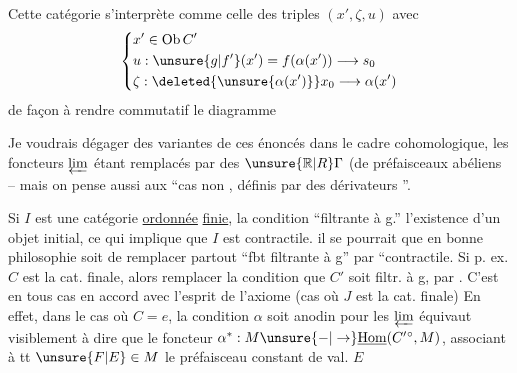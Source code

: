 Cette catégorie s'interprète comme celle des triples $(x',\zeta,u)$ avec
\[
\left\{\begin{aligned}
 &x'\in\operatorname{Ob}C'\\
 &u:\unsure{g|f'}(x')=f(\alpha(x'))\longrightarrow s_0\\
 &\zeta:\deleted{\unsure{\alpha(x')}}x_0\longrightarrow\alpha(x')
\end{aligned}\right.
\]
de façon à rendre commutatif le diagramme

Je voudrais dégager des variantes de ces énoncés dans le cadre cohomologique, les foncteurs $\varprojlim$ étant remplacés par des $\unsure{\mathbb R|R}\Gamma$ (de préfaisceaux abéliens  -- mais on pense aussi aux ``cas non , définis par des dérivateurs ''.

Si $I$ est une catégorie \uline{ordonnée} \uline{finie}, la condition ``filtrante à g.''   l'existence d'un objet initial, ce qui implique que $I$ est contractile.   il se pourrait que en bonne philosophie soit de remplacer partout ``fbt filtrante à g'' par ``contractile.  Si p. ex. $C$ est la cat. finale, alors remplacer la condition que $C'$ soit filtr. à g, par . C'est en tous cas en accord avec l'esprit de l'axiome  (cas où $J$ est la cat. finale) En effet, dans le cas où $C=e$, la condition  $\alpha$ soit anodin pour les $\varprojlim$ équivaut visiblement à dire que le foncteur $\alpha^*:M\unsure{-|\to}\underline{\mathrm{Hom}}(C'{}^\circ,M)$, associant à tt $\unsure{F|E}\in M$ le préfaisceau constant de val. $E$
